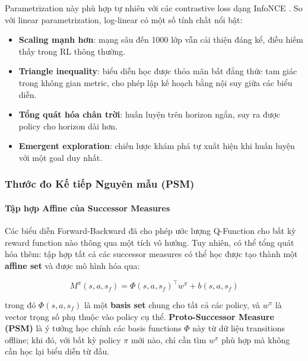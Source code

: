 Parametrization này phù hợp tự nhiên với các contrastive loss dạng
InfoNCE \cite{eysenbach2025generativerl}. So với linear parametrization,
log-linear có một số tính chất nổi bật:

\begin{itemize}
    \item \textbf{Scaling mạnh hơn}: mạng sâu đến 1000 lớp vẫn cải
    thiện đáng kể, điều hiếm thấy trong RL thông thường.
    \item \textbf{Triangle inequality}: biểu diễn học được thỏa mãn
    bất đẳng thức tam giác trong không gian metric, cho phép lập kế
    hoạch bằng nội suy giữa các biểu diễn.
    \item \textbf{Tổng quát hóa chân trời}: huấn luyện trên horizon
    ngắn, suy ra được policy cho horizon dài hơn.
    \item \textbf{Emergent exploration}: chiến lược khám phá tự xuất
    hiện khi huấn luyện với một goal duy nhất.
\end{itemize}

\subsubsection{Thước đo Kế tiếp Nguyên mẫu (PSM)}

\paragraph{Tập hợp Affine của Successor Measures}

Các biểu diễn Forward-Backward đã cho phép ước lượng Q-Function cho
bất kỳ reward function nào thông qua một tích vô hướng. Tuy nhiên, có
thể tổng quát hóa thêm: tập hợp tất cả các successor measures có thể
học được tạo thành một \textbf{affine set} và được mô hình hóa qua:

\begin{equation}
    M^\pi(s, a, s_f) = \Phi(s, a, s_f)^\top w^\pi + b(s, a, s_f)
    \label{eq:psm}
\end{equation}

trong đó $\Phi(s, a, s_f)$ là một \textbf{basis set} chung cho tất cả
các policy, và $w^\pi$ là vector trọng số phụ thuộc vào policy cụ thể.
\textbf{Proto-Successor Measure (PSM)} là ý tưởng học chính các basis
functions $\Phi$ này từ dữ liệu transitions offline; khi đó, với bất
kỳ policy $\pi$ mới nào, chỉ cần tìm $w^\pi$ phù hợp mà không cần
học lại biểu diễn từ đầu.

